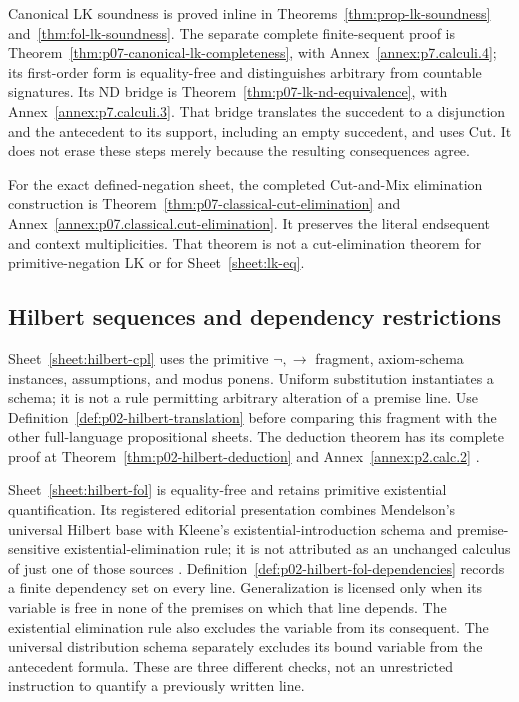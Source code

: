 
Canonical LK soundness is proved inline in
Theorems~\ref{thm:prop-lk-soundness} and~\ref{thm:fol-lk-soundness}.
The separate complete finite-sequent proof is
Theorem~\ref{thm:p07-canonical-lk-completeness}, with
Annex~\ref{annex:p7.calculi.4}; its first-order form is equality-free and
distinguishes arbitrary from countable signatures.  Its ND bridge is
Theorem~\ref{thm:p07-lk-nd-equivalence}, with
Annex~\ref{annex:p7.calculi.3}.  That bridge translates the succedent to a
disjunction and the antecedent to its support, including an empty
succedent, and uses Cut.  It does not erase these steps merely because the
resulting consequences agree.

For the exact defined-negation sheet, the completed Cut-and-Mix
elimination construction is Theorem~\ref{thm:p07-classical-cut-elimination}
and Annex~\ref{annex:p07.classical.cut-elimination}.  It preserves the
literal endsequent and context multiplicities.  That theorem is not a
cut-elimination theorem for primitive-negation LK or for
Sheet~\ref{sheet:lk-eq}.

\subsection{Hilbert sequences and dependency restrictions}

Sheet~\ref{sheet:hilbert-cpl} uses the primitive
\(\neg,\to\) fragment, axiom-schema instances, assumptions, and modus
ponens.  Uniform substitution instantiates a schema; it is not a rule
permitting arbitrary alteration of a premise line.  Use
Definition~\ref{def:p02-hilbert-translation} before comparing this fragment
with the other full-language propositional sheets.  The deduction theorem
has its complete proof at Theorem~\ref{thm:p02-hilbert-deduction} and
Annex~\ref{annex:p2.calc.2} \cite{Mendelson1997}.


Sheet~\ref{sheet:hilbert-fol} is equality-free and retains primitive
existential quantification.  Its registered editorial presentation combines
Mendelson's universal Hilbert base with Kleene's existential-introduction
schema and premise-sensitive existential-elimination rule; it is not
attributed as an unchanged calculus of just one of those sources
\cite{Mendelson1997,Kleene1952,Enderton2001}.
Definition~\ref{def:p02-hilbert-fol-dependencies} records a finite dependency
set on every line.  Generalization is licensed only when its variable is
free in none of the premises on which that line depends.  The existential
elimination rule also excludes the variable from its consequent.  The
universal distribution schema separately excludes its bound variable from
the antecedent formula.  These are three different checks, not an
unrestricted instruction to quantify a previously written line.

